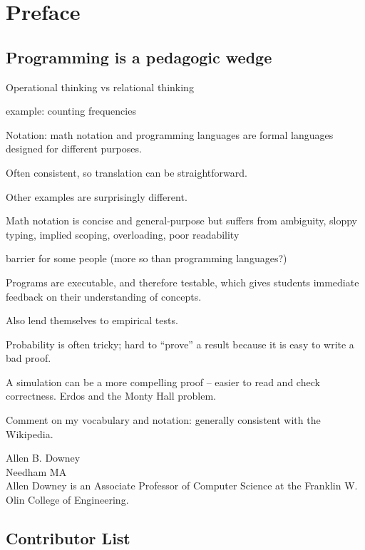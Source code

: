 \documentclass[10pt]{book}
\begin{document}
\chapter{Preface}

\section*{Programming is a pedagogic wedge}

Operational thinking vs relational thinking

example: counting frequencies

Notation: math notation and programming languages are formal languages
designed for different purposes.

Often consistent, so translation can be straightforward.

Other examples are surprisingly different.

Math notation is concise and general-purpose but suffers from
ambiguity, sloppy typing, implied scoping, overloading, poor
readability

barrier for some people (more so than programming languages?)

Programs are executable, and therefore testable, which gives students
immediate feedback on their understanding of concepts.

Also lend themselves to empirical tests.

Probability is often tricky; hard to ``prove'' a result because it
is easy to write a bad proof.

A simulation can be a more compelling proof -- easier to read and check
correctness.  Erdos and the Monty Hall problem.

Comment on my vocabulary and notation: generally consistent with the
Wikipedia.


Allen B. Downey \\
Needham MA\\

Allen Downey is an Associate Professor of Computer Science at 
the Franklin W. Olin College of Engineering.







\section*{Contributor List}
\end{document}
